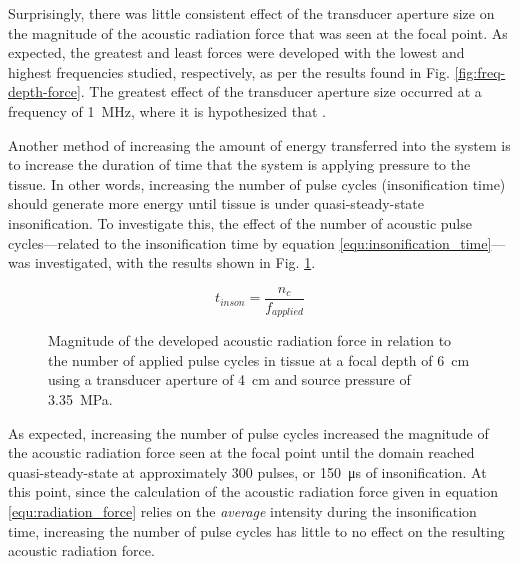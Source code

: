 {			Surprisingly, there was little consistent effect of the transducer aperture size on the magnitude of the acoustic radiation force that was seen at the focal point. As expected, the greatest and least forces were developed with the lowest and highest frequencies studied, respectively, as per the results found in Fig. \ref{fig:freq-depth-force}. The greatest effect of the transducer aperture size occurred at a frequency of \SI{1}{\MHz}, where it is hypothesized that .

			Another method of increasing the amount of energy transferred into the system is to increase the duration of time that the system is applying pressure to the tissue. In other words, increasing the number of pulse cycles (insonification time) should generate more energy until tissue is under quasi-steady-state insonification. To investigate this, the effect of the number of acoustic pulse cycles---related to the insonification time by equation \ref{equ:insonification_time}---was investigated, with the results shown in Fig. \ref{fig:pulse_cycles_force}.

			\begin{equation}
			\label{equ:insonification_time}
				t_{inson} = \frac{n_c}{f_{applied}}
			\end{equation}

			\begin{figure}[!htb]
				\centering
				\caption[Magnitude of developed acoustic radiation force in relation to the number of applied pulse cycles]{Magnitude of the developed acoustic radiation force in relation to the number of applied pulse cycles in tissue at a focal depth of \SI{6}{\cm} using a transducer aperture of \SI{4}{\cm} and source pressure of \SI{3.35}{\MPa}.}
				\label{fig:pulse_cycles_force}
			\end{figure}

			As expected, increasing the number of pulse cycles increased the magnitude of the acoustic radiation force seen at the focal point until the domain reached quasi-steady-state at approximately 300 pulses, or \SI{150}{\us} of insonification. At this point, since the calculation of the acoustic radiation force given in equation \ref{equ:radiation_force} relies on the \emph{average} intensity during the insonification time, increasing the number of pulse cycles has little to no effect on the resulting acoustic radiation force.

}
